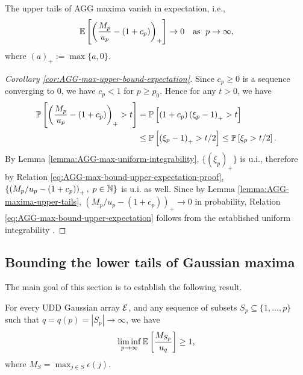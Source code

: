\begin{corollary} \label{cor:AGG-max-upper-bound-expectation}
The upper tails of AGG maxima vanish in expectation, i.e.,
    \begin{equation} \label{eq:AGG-max-bound-upper-expectation}
    \E\left[\left(\frac{M_p}{u_p} - (1+c_p)\right)_+\right]
    \to 0 \quad\text{as }\; p\to\infty,
\end{equation}
where $(a)_+ := \max\{a,0\}$.
\end{corollary}

\begin{proof}[Corollary \ref{cor:AGG-max-upper-bound-expectation}]
Since $c_p\ge0$ is a sequence converging to 0, we have $c_p < 1$ for $p \ge p_0$. Hence for any $t>0$, we have
\begin{align}
    \P\left[\left(\frac{M_p}{u_p} - (1+c_p)\right)_+ > t\right] 
    &= \P\left[(1+c_p)\left(\xi_p-1\right)_+ > t\right] \nonumber \\
    &\le \P\left[\left(\xi_p-1\right)_+ > t/2\right] 
    \le \P\left[\xi_p > t/2 \right]. \label{eq:AGG-max-bound-upper-expectation-proof}
\end{align}
By Lemma \ref{lemma:AGG-max-uniform-integrability}, $\{\left(\xi_p\right)_+\}$ is u.i., therefore by Relation \eqref{eq:AGG-max-bound-upper-expectation-proof}, $\{\left(M_p/u_p - (1+c_p)\right)_+,\;p\in\N\}$ is u.i. as well.
Since by Lemma \ref{lemma:AGG-maxima-upper-tails}, $\left(M_p/u_p - (1+c_p)\right)_+\to 0$ in probability, Relation \eqref{eq:AGG-max-bound-upper-expectation} follows from the established uniform integrability \citep[see, e.g., Theorem 6.6.1 in][]{resnick:1999book}.
\end{proof}


\subsection{Bounding the lower tails of Gaussian maxima}
\label{subsec:bounding-lower-tails-of-maxima}

The main goal of this section is to establish the following result. 

\begin{proposition} \label{prop:Gaussian-maxima-expectation-lower-bound}
For every UDD Gaussian array $\cal E$, and any sequence of subsets
$S_p\subseteq\{1,\ldots,p\}$ such that $q = q(p) = |S_p|\to \infty$, we have
\begin{equation} \label{eq:AGG-max-bound-expectation}
    \liminf_{p\to\infty} \E\left[\frac{M_{S_p}}{u_q}\right] \ge 1,
\end{equation}
where $M_S = \max_{j\in S}\epsilon(j)$.
\end{proposition}

